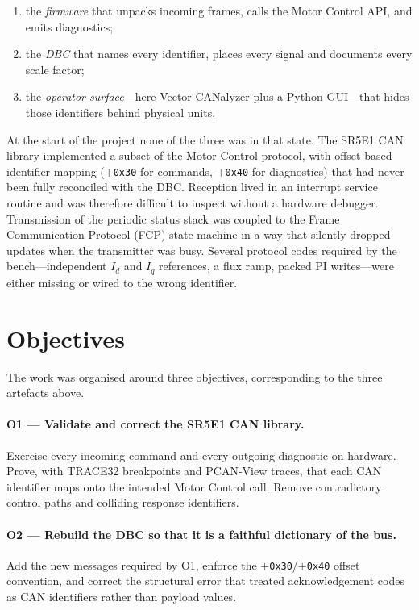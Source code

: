 \begin{enumerate}[leftmargin=1.6em]
  \item the \emph{firmware} that unpacks incoming frames, calls the Motor
        Control API, and emits diagnostics;
  \item the \emph{DBC} that names every identifier, places every signal and
        documents every scale factor;
  \item the \emph{operator surface}---here Vector CANalyzer plus a Python
        GUI---that hides those identifiers behind physical units.
\end{enumerate}

At the start of the project none of the three was in that state. The SR5E1
CAN library implemented a subset of the Motor Control protocol, with
offset-based identifier mapping ($+$\texttt{0x30} for commands,
$+$\texttt{0x40} for diagnostics) that had never been fully reconciled with
the DBC. Reception lived in an interrupt service routine and was therefore
difficult to inspect without a hardware debugger. Transmission of the
periodic status stack was coupled to the Frame Communication Protocol (FCP)
state machine in a way that silently dropped updates when the transmitter
was busy. Several protocol codes required by the bench---independent $I_d$
and $I_q$ references, a flux ramp, packed PI writes---were either missing or
wired to the wrong identifier.

\section{Objectives}
The work was organised around three objectives, corresponding to the three
artefacts above.

\paragraph{O1 --- Validate and correct the SR5E1 CAN library.}
Exercise every incoming command and every outgoing diagnostic on hardware.
Prove, with TRACE32 breakpoints and PCAN-View traces, that each CAN
identifier maps onto the intended Motor Control call. Remove contradictory
control paths and colliding response identifiers.

\paragraph{O2 --- Rebuild the DBC so that it is a faithful dictionary of the
bus.}
Add the new messages required by O1, enforce the $+$\texttt{0x30}/$+$\texttt{0x40}
offset convention, and correct the structural error that treated
acknowledgement codes as CAN identifiers rather than payload values.

